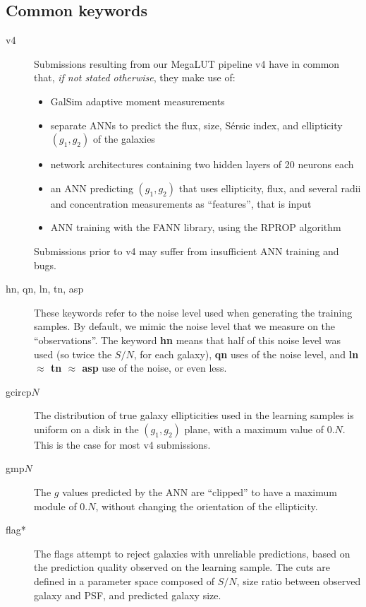 \documentclass[a4paper,11pt]{scrartcl}
\begin{document}
\subsection{Common keywords}

\begin{description}

\item[v4] Submissions resulting from our MegaLUT pipeline v4 have in common that, \emph{if not stated otherwise}, they make use of:
\begin{itemize}
\item GalSim adaptive moment measurements
\item separate ANNs to predict the flux, size, S\'ersic index, and ellipticity $(g_1, g_2)$ of the galaxies
\item network architectures containing two hidden layers of 20 neurons each
\item an ANN predicting $(g_1, g_2)$ that uses ellipticity, flux, and several radii and concentration measurements as ``features'', that is input
\item ANN training with the FANN library, using the RPROP algorithm
\end{itemize}
Submissions prior to v4 may suffer from insufficient ANN training and bugs.

\item[hn, qn, ln, tn, asp] These keywords refer to the noise level used when generating the training samples. By default, we mimic the noise level that we measure on the ``observations''. The keyword {\bfseries hn} means that half of this noise level was used (so twice the $S/N$, for each galaxy), {\bf qn} uses  of the noise level, and {\bf ln $\approx$ tn $\approx$ asp} use  of the noise, or even less.

\item [gcircp$N$] The distribution of true galaxy ellipticities used in the learning samples is uniform on a disk in the $(g_1, g_2)$ plane, with a maximum value of 0.$N$. This is the case for most v4 submissions.

\item [gmp$N$] The $g$ values predicted by the ANN are ``clipped'' to have a maximum module of 0.$N$, without changing the orientation of the ellipticity.

\item [flag*] The flags attempt to reject galaxies with unreliable predictions, based on the prediction quality observed on the learning sample. The cuts are defined in a parameter space composed of $S/N$, size ratio between observed galaxy and PSF, and predicted galaxy size.

\end{description}
\end{document}
